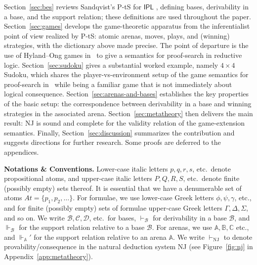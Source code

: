 \documentclass{lipics-v2021}
\newcommand{\deriv}[1]{\vdash_{#1}}       %
\newcommand{\supp}[1]{\Vdash_{#1}}
\newcommand{\arenasupp}[1]{\Vdash_{#1}'}  %
\newcommand{\base}[1]{\mathcal{#1}}                    %
\newcommand{\arena}[1]{\mathbb{#1}}                     %
\newcommand{\At}{\mathit{At}}                           %
\newcommand{\NJ}{\mathrm{NJ}}
\newcommand{\IPL}{\textsf{IPL}}
\begin{document}
Section~\ref{sec:bes} reviews Sandqvist's P-tS for $\IPL$ \cite{Sandqvist_Tor}, defining bases, derivability in a base, and the support relation; these definitions are used throughout the paper. Section~\ref{sec:games} develops the game-theoretic apparatus from the inferentialist point of view realized by P-tS: atomic arenas, moves, plays, and (winning) strategies, with the dictionary above made precise. The point of departure is the use of Hyland--Ong games in~\cite{Pym_ReductiveLogic} to give a semantics for proof-search in reductive logic. Section~\ref{sec:sudoku} gives a substantial worked example, namely $4 \times 4$ Sudoku, which shares the player-vs-environment setup of the game semantics for proof-search in~\cite{Pym_ReductiveLogic} while being a familiar game that is not immediately about logical consequence. Section~\ref{sec:arenas-and-bases} establishes the key properties of the basic setup: the correspondence between derivability in a base and winning strategies in the associated arena. Section~\ref{sec:metatheory} then delivers the main result: NJ is sound and complete for the validity relation of the game-extension semantics. Finally, Section~\ref{sec:discussion} summarizes the contribution and suggests directions for further research. Some proofs are deferred to the appendices.
 
\noindent \textbf{Notations \& Conventions.}
Lower-case italic letters $p, q, r, s$, etc.\ denote propositional atoms, and upper-case italic letters $P, Q, R, S$, etc.\ denote finite (possibly empty) sets thereof. It is essential that we have a denumerable set of atoms $\At = \{p_1, p_2, \ldots\}$.
For formulae, we use lower-case Greek letters $\phi, \psi, \gamma$, etc., and for finite (possibly empty) sets of formulae upper-case Greek letters $\Gamma, \Delta, \Sigma$, and so on. We write $\base{B}, \base{C}, \base{D}$, etc.\ for bases, $\deriv{\base{B}}$ for
derivability in a base $\base{B}$, and $\supp{\base{B}}$ for the support relation relative to a base $\base{B}$. For arenas, we use $\arena{A}, \arena{B, \arena{C}}$ etc., and $\arenasupp{\arena{A}}$ for the support relation relative to an arena $\arena{A}$. We write $\vdash_{\NJ}$ to denote provability/consequence
in the natural deduction system NJ \cite{Gentzen1935,Prawitz1965} (see Figure~\ref{fig:nj} in Appendix~\ref{app:metatheory}).
 
\end{document}
